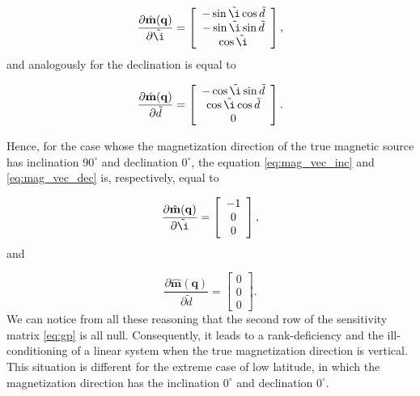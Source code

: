 \begin{equation}
	\dfrac{\partial \hat{\mathbf{m}}(\mathbf{q})}{\partial {\tilde{\i}}} =
	\left[ \begin{array}{c}
		-\sin \tilde{\i} \cos \tilde{d} \\
		-\sin \tilde{\i} \sin \tilde{d}\\
		 \cos \tilde{\i}
	\end{array} \right], 
	\label{eq:mag_vec_inc}
\end{equation}
and analogously for the declination is equal to 

\begin{equation}
	\dfrac{\partial \hat{\mathbf{m}}(\mathbf{q})}{\partial {\tilde{d}}} =
	\left[ \begin{array}{c}
		-\cos \tilde{\i} \sin \tilde{d} \\
		\cos \tilde{\i} \cos \tilde{d}\\
		0
	\end{array} \right]. 
	\label{eq:mag_vec_dec}
\end{equation}

Hence, for the case whose the magnetization direction of the true magnetic source has inclination $90^\circ$ and declination $0^\circ$, the equation \ref{eq:mag_vec_inc} and \ref{eq:mag_vec_dec} is, respectively, equal to 

 
\begin{equation}
	\dfrac{\partial \hat{\mathbf{m}}(\mathbf{q})}{\partial {\tilde{\i}}} =
	\left[ \begin{array}{c}
		-1 \\
		 0 \\
		 0
	\end{array} \right], 
	\label{eq:mag_vec_inc_90}
\end{equation}
and 

\begin{equation}
	\dfrac{\partial \hat{\mathbf{m}}(\mathbf{q})}{\partial {\tilde{d}}} =
	\left[ \begin{array}{c}
		0 \\
		0 \\
		0
	\end{array} \right]. 
	\label{eq:mag_vec_dec_0}
\end{equation}
We can notice from all these reasoning that the second row of the sensitivity matrix \ref{eq:gp} is all null. Consequently, it leads to a rank-deficiency and the ill-conditioning of a linear system when the true magnetization direction is vertical. This situation is different for the extreme case of low latitude, in which the magnetization direction has the inclination $0^\circ$ and declination $0^\circ$. 

           



